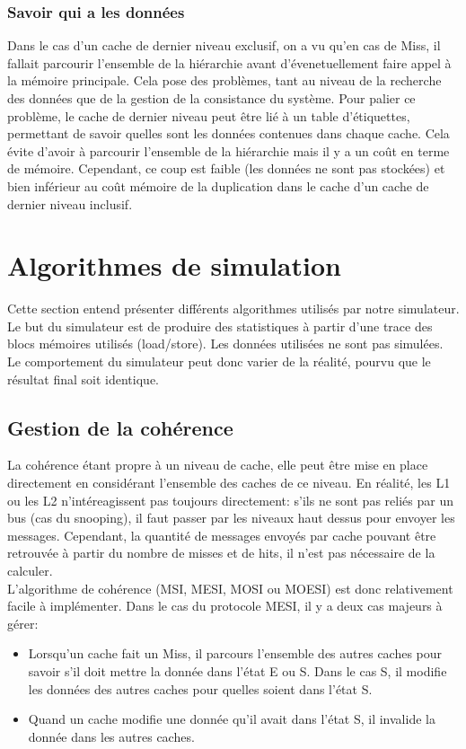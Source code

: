 \documentclass[a4paper]{article}
\begin{document}
\subsubsection{Savoir qui a les données}
\indent Dans le cas d'un cache de dernier niveau exclusif, on a vu qu'en cas de Miss, il fallait parcourir l'ensemble de la hiérarchie avant d'évenetuellement faire appel à la mémoire principale. Cela pose des problèmes, tant au niveau de la recherche des données que de la gestion de la consistance du système. Pour palier ce problème, le cache de dernier niveau peut être lié à un table d'étiquettes, permettant de savoir quelles sont les données contenues dans chaque cache. Cela évite d'avoir à parcourir l'ensemble de la hiérarchie mais il y a un coût en terme de mémoire. Cependant, ce coup est faible (les données ne sont pas stockées) et bien inférieur au coût mémoire de la duplication dans le cache d'un cache de dernier niveau inclusif.

\newpage
\section{Algorithmes de simulation}
\indent Cette section entend présenter différents algorithmes utilisés par notre simulateur. Le but du simulateur est de produire des statistiques à partir d'une trace des blocs mémoires utilisés (load/store). Les données utilisées ne sont pas simulées. Le comportement du simulateur peut donc varier de la réalité, pourvu que le résultat final soit identique.

\subsection{Gestion de la cohérence}
\indent La cohérence étant propre à un niveau de cache, elle peut être mise en place directement en considérant l'ensemble des caches de ce niveau. En réalité, les L1 ou les L2 n'intéreagissent pas toujours directement: s'ils ne sont pas reliés par un bus (cas du snooping), il faut passer par les niveaux haut dessus pour envoyer les messages. Cependant, la quantité de messages envoyés par cache pouvant être retrouvée à partir du nombre de misses et de hits, il n'est pas nécessaire de la calculer. \\

\indent L'algorithme de cohérence (MSI, MESI, MOSI ou MOESI) est donc relativement facile à implémenter. Dans le cas du protocole MESI, il y a deux cas majeurs à gérer: \\
\begin{itemize}
\item Lorsqu'un cache fait un Miss, il parcours l'ensemble des autres caches pour savoir s'il doit mettre la donnée dans l'état E ou S. Dans le cas S, il modifie les données des autres caches pour quelles soient dans l'état S.
\item Quand un cache modifie une donnée qu'il avait dans l'état S, il invalide la donnée dans les autres caches.
\end{itemize}
\end{document}
